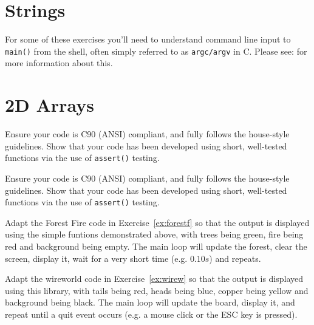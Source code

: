 \chapter{Strings}

For some of these exercises you'll need to understand command line input to
\verb^main()^ from the shell, often simply referred to as \verb^argc/argv^ in C.
Please see:
for more information about this.









\chapter{2D Arrays}






\noindent Ensure your code is C90 (ANSI) compliant, and fully follows the house-style guidelines.
Show that your code has been developed using short, well-tested functions via the use of \verb^assert()^ testing.



\noindent Ensure your code is C90 (ANSI) compliant, and fully follows the house-style guidelines.
Show that your code has been developed using short, well-tested functions via the use of \verb^assert()^ testing.





%



\begin{exercise}
Adapt the Forest Fire code in Exercise~\ref{ex:forestf} so that the output
is displayed using the simple funtions demonstrated above, with trees being green, fire being red and
background being empty.  The main loop will
update the forest, clear the screen, display it, wait for a very short time (e.g. $0.10s$) and repeats.
\end{exercise}



\begin{exercise}
Adapt the wireworld code in Exercise~\ref{ex:wirew} so that the output
is displayed using this library, with tails being red, heads being blue,
copper being yellow and background being black.  The main loop will
update the board, display it, and repeat until a quit event occurs
(e.g. a mouse click or the ESC key is pressed).  \end{exercise}

